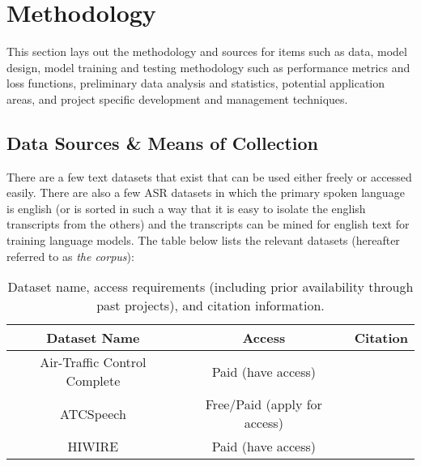 \documentclass[10pt]{article}
\begin{document}
    \section{Methodology}
        This section lays out the methodology and sources for items such as data, model design, model training and testing methodology
        such as performance metrics and loss functions, preliminary data analysis and statistics, potential application areas, and
        project specific development and management techniques.

        \subsection{Data Sources \& Means of Collection}
        There are a few text datasets that exist that can be used either freely or accessed easily. There are also a few ASR datasets
        in which the primary spoken language is english (or is sorted in such a way that it is easy to isolate the english transcripts
        from the others) and the transcripts can be mined for english text for training language models. The table below lists the
        relevant datasets (hereafter referred to as \textit{the corpus}):

        \begin{table}[h!]
            \centering
            \begin{tabular}{c|c|c}
                Dataset Name & Access & Citation \\
                \hline
                Air-Traffic Control Complete & Paid (have access) & \cite{godfrey_air_1994} \\
                ATCSpeech & Free/Paid (apply for access) & \cite{yang_atcspeech_2020} \\
                HIWIRE & Paid (have access) & \cite{segura_hiwire_2007} \\
            \end{tabular}
            \label{table:datasets}
            \caption{Dataset name, access requirements (including prior availability through past projects), and citation information.}
        \end{table}
\end{document}

